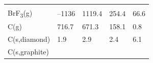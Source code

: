 \documentclass[
]{book}
\theoremstyle{definition}
\theoremstyle{definition}
\theoremstyle{definition}
\theoremstyle{remark}
\begin{document}
\begin{longtable}[]{@{}lllll@{}}
\begin{minipage}[t]{0.18\columnwidth}
\end{minipage}\tabularnewline
\begin{minipage}[t]{0.10\columnwidth}\raggedright
BrF\textsubscript{3}(g)\strut
\end{minipage} & \begin{minipage}[t]{0.19\columnwidth}\raggedright
--1136\strut
\end{minipage} & \begin{minipage}[t]{0.20\columnwidth}\raggedright
1119.4\strut
\end{minipage} & \begin{minipage}[t]{0.18\columnwidth}\raggedright
254.4\strut
\end{minipage} & \begin{minipage}[t]{0.18\columnwidth}\raggedright
66.6\strut
\end{minipage}\tabularnewline
\begin{minipage}[t]{0.10\columnwidth}\raggedright
C(g)\strut
\end{minipage} & \begin{minipage}[t]{0.19\columnwidth}\raggedright
716.7\strut
\end{minipage} & \begin{minipage}[t]{0.20\columnwidth}\raggedright
671.3\strut
\end{minipage} & \begin{minipage}[t]{0.18\columnwidth}\raggedright
158.1\strut
\end{minipage} & \begin{minipage}[t]{0.18\columnwidth}\raggedright
0.8\strut
\end{minipage}\tabularnewline
\begin{minipage}[t]{0.10\columnwidth}\raggedright
C(s,diamond)\strut
\end{minipage} & \begin{minipage}[t]{0.19\columnwidth}\raggedright
1.9\strut
\end{minipage} & \begin{minipage}[t]{0.20\columnwidth}\raggedright
2.9\strut
\end{minipage} & \begin{minipage}[t]{0.18\columnwidth}\raggedright
2.4\strut
\end{minipage} & \begin{minipage}[t]{0.18\columnwidth}\raggedright
6.1\strut
\end{minipage}\tabularnewline
\begin{minipage}[t]{0.10\columnwidth}\raggedright
C(s,graphite)\strut

\end{minipage}
\end{longtable}
\end{document}
